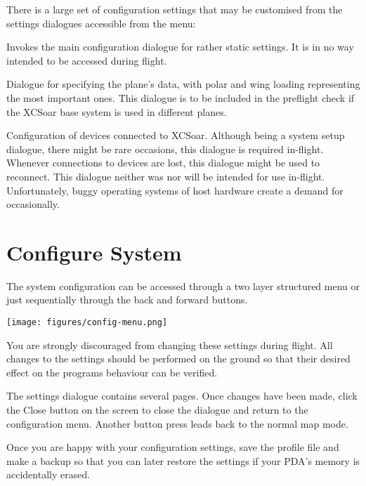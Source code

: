 There is a large set of configuration settings that may be customised
from the settings dialogues accessible from the menu:
\begin{jspecs}
\item[\bmenug{Config 2/3}\blink\bmenug{System}] Invokes the main configuration dialogue for rather static settings. It is in no way intended to be accessed during flight.
\item[\bmenug{Config 2/3}\blink\bmenug{Plane}] Dialogue for specifying the plane's data, with polar and wing loading representing the most important ones. This dialogue is to be included in the preflight check if the XCSoar base system is used in different planes.
\item[\bmenug{Config 2/3}\blink\bmenug{Devices}] Configuration of devices  connected to XCSoar. Although being a system setup dialogue, there might be rare occasions, this dialogue is required in-flight.  Whenever connections to devices are lost, this dialogue might be used to reconnect. This dialogue neither was nor will be intended for use in-flight. Unfortunately, buggy operating systems of host hardware create a demand for occasionally.
\end{jspecs}

\section{Configure System}
The system configuration can be accessed through a two layer structured menu 
or just sequentially through the back and forward buttons.

\begin{center}
\texttt{[image: figures/config-menu.png]}
\end{center}

You are strongly discouraged from changing these settings during
flight.  \warning  All changes to the settings should be performed on the ground
so that their desired effect on the programs behaviour can be
verified.

The settings dialogue contains several pages.  Once changes have been made,
click the Close button on the screen to close the dialogue
and return to the configuration menu. Another button press leads back to 
the normal map mode.

\tip Once you are happy with your configuration settings, save the
profile file and make a backup so that you can later restore the
settings if your PDA's memory is accidentally erased.

